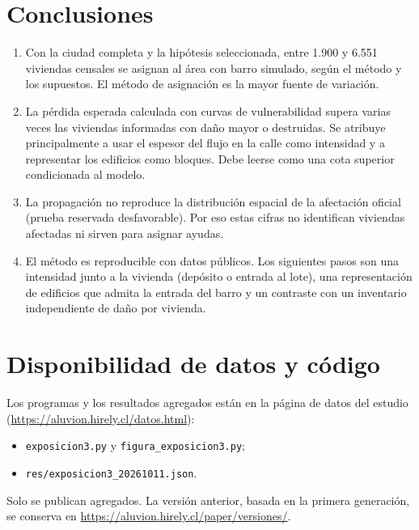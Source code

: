 \documentclass[10pt,a4paper]{article}
\begin{document}
\section{Conclusiones}
\begin{enumerate}
\item Con la ciudad completa y la hipótesis seleccionada, entre 1.900 y 6.551 viviendas censales se asignan al área con barro simulado, según el método y los supuestos. El método de asignación es la mayor fuente de variación.
\item La pérdida esperada calculada con curvas de vulnerabilidad supera varias veces las viviendas informadas con daño mayor o destruidas. Se atribuye principalmente a usar el espesor del flujo en la calle como intensidad y a representar los edificios como bloques. Debe leerse como una cota superior condicionada al modelo.
\item La propagación no reproduce la distribución espacial de la afectación oficial (prueba reservada desfavorable). Por eso estas cifras no identifican viviendas afectadas ni sirven para asignar ayudas.
\item El método es reproducible con datos públicos. Los siguientes pasos son una intensidad junto a la vivienda (depósito o entrada al lote), una representación de edificios que admita la entrada del barro y un contraste con un inventario independiente de daño por vivienda.
\end{enumerate}

\section*{Disponibilidad de datos y código}
Los programas y los resultados agregados están en la página de datos del estudio (\url{https://aluvion.hirely.cl/datos.html}):
\begin{itemize}
\item \texttt{exposicion3.py} y \texttt{figura\_exposicion3.py};
\item \texttt{res/exposicion3\_20261011.json}.
\end{itemize}
Solo se publican agregados. La versión anterior, basada en la primera generación, se conserva en \url{https://aluvion.hirely.cl/paper/versiones/}.



\end{document}
